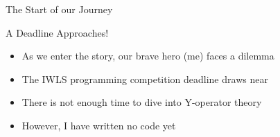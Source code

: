 \begin{frame}[t]{The Start of our Journey}

	\begin{block}{A Deadline Approaches!}
		\begin{itemize}
			\pause
			\item As we enter the story, our brave hero (me) faces a dilemma
			\item The IWLS programming competition deadline draws near
			\pause
			\item There is not enough time to dive into Y-operator theory
			\item However, I have written no code yet
		\end{itemize}
	\end{block}
\end{frame}

